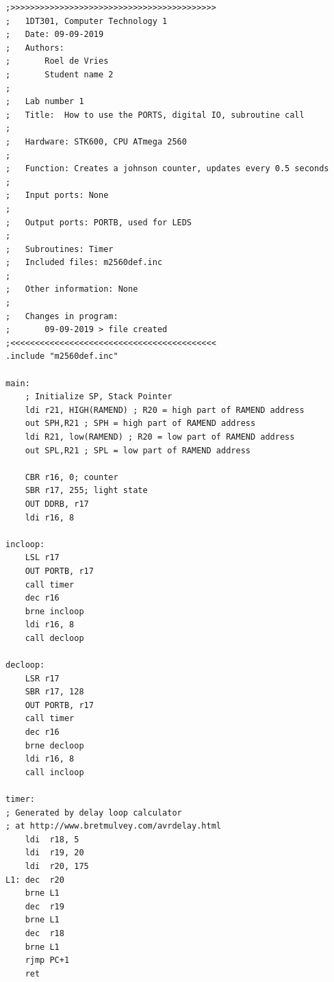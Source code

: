 \documentclass[a4paper,12pt]{article}
\begin{document}
\begin{lstlisting}
;>>>>>>>>>>>>>>>>>>>>>>>>>>>>>>>>>>>>>>>>>>
;	1DT301, Computer Technology 1
;	Date: 09-09-2019
;	Authors:
;		Roel de Vries
;		Student name 2
;
;	Lab number 1
;	Title:	How to use the PORTS, digital IO, subroutine call
;
;	Hardware: STK600, CPU ATmega 2560
;
;	Function: Creates a johnson counter, updates every 0.5 seconds
;
;	Input ports: None
;
;	Output ports: PORTB, used for LEDS
;
;	Subroutines: Timer
;	Included files: m2560def.inc
;
;	Other information: None
;
;	Changes in program: 
;		09-09-2019 > file created
;<<<<<<<<<<<<<<<<<<<<<<<<<<<<<<<<<<<<<<<<<<
.include "m2560def.inc"

main:
	; Initialize SP, Stack Pointer
	ldi r21, HIGH(RAMEND) ; R20 = high part of RAMEND address
	out SPH,R21 ; SPH = high part of RAMEND address
	ldi R21, low(RAMEND) ; R20 = low part of RAMEND address
	out SPL,R21 ; SPL = low part of RAMEND address

	CBR r16, 0; counter
	SBR r17, 255; light state 
	OUT DDRB, r17
	ldi r16, 8

incloop:
	LSL r17
	OUT PORTB, r17
	call timer
	dec r16
    brne incloop
	ldi r16, 8
	call decloop

decloop:
	LSR r17
	SBR r17, 128
	OUT PORTB, r17
	call timer
	dec r16
    brne decloop
	ldi r16, 8
	call incloop

timer:
; Generated by delay loop calculator
; at http://www.bretmulvey.com/avrdelay.html
	ldi  r18, 5
    ldi  r19, 20
    ldi  r20, 175
L1: dec  r20
    brne L1
    dec  r19
    brne L1
    dec  r18
    brne L1
    rjmp PC+1
	ret

\end{lstlisting}




\end{document}
